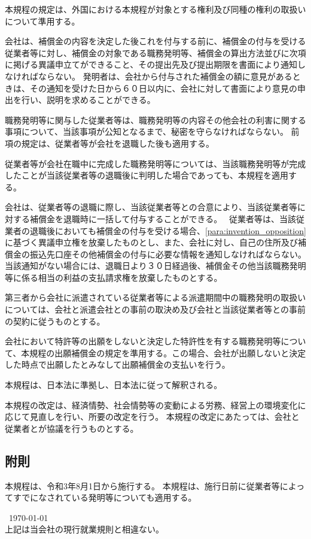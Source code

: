 \documentclass[10pt,a4paper,uplatex]{jsarticle}
\begin{document}
本規程の規定は、外国における本規程が対象とする権利及び同種の権利の取扱いについて準用する。

会社は、補償金の内容を決定した後これを付与する前に、補償金の付与を受ける従業者等に対し、補償金の対象である職務発明等、補償金の算出方法並びに次項に掲げる異議申立てができること、その提出先及び提出期限を書面により通知しなければならない。
\label{para:invention_opposition}
\term 発明者は、会社から付与された補償金の額に意見があるときは、その通知を受けた日から６０日以内に、会社に対して書面により意見の申出を行い、説明を求めることができる。

職務発明等に関与した従業者等は、職務発明等の内容その他会社の利害に関する事項について、当該事項が公知となるまで、秘密を守らなければならない。
\term 前項の規定は、従業者等が会社を退職した後も適用する。

従業者等が会社在職中に完成した職務発明等については、当該職務発明等が完成したことが当該従業者等の退職後に判明した場合であっても、本規程を適用する。

会社は、従業者等の退職に際し、当該従業者等との合意により、当該従業者等に対する補償金を退職時に一括して付与することができる。　
\label{para:invention_retiree}
\term 従業者等は、当該従業者の退職後においても補償金の付与を受ける場合、\ref{para:invention_opposition}に基づく異議申立権を放棄したものとし、また、会社に対し、自己の住所及び補償金の振込先口座その他補償金の付与に必要な情報を通知しなければならない。当該通知がない場合には、退職日より３０日経過後、補償金その他当該職務発明等に係る相当の利益の支払請求権を放棄したものとする。

第三者から会社に派遣されている従業者等による派遣期間中の職務発明の取扱いについては、会社と派遣会社との事前の取決め及び会社と当該従業者等との事前の契約に従うものとする。

会社において特許等の出願をしないと決定した特許性を有する職務発明等について、本規程の出願補償金の規定を準用する。この場合、会社が出願しないと決定した時点で出願したとみなして出願補償金の支払いを行う。

本規程は、日本法に準拠し、日本法に従って解釈される。

本規程の改定は、経済情勢、社会情勢等の変動による労務、経営上の環境変化に応じて見直しを行い、所要の改定を行う。
\term 本規程の改定にあたっては、会社と従業者とが協議を行うものとする。

\subsection*{附則}
本規程は、令和3年8月1日から施行する。
本規程は、施行日前に従業者等によってすでになされている発明等についても適用する。


\begin{flushleft}\
\today\\
\vspace{10pt}
上記は当会社の現行就業規則と相違ない。\\
\vspace{10pt}
\MakeSignatureField
\end{flushleft}
\end{document}
